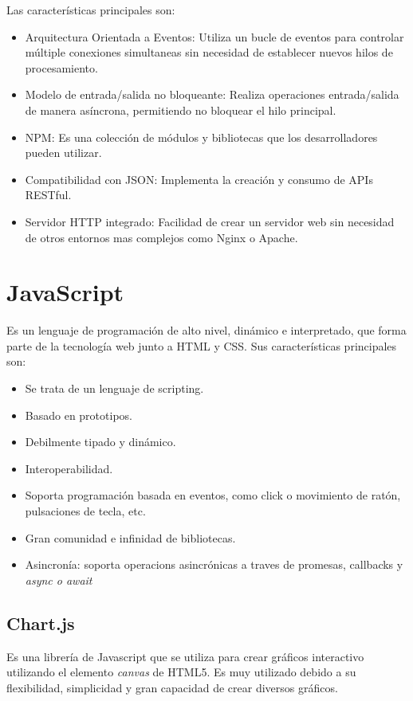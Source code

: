 \documentclass[a4paper, 12pt]{book}
\begin{document}
Las características principales son:

\begin{itemize}
    \item Arquitectura Orientada a Eventos: Utiliza un bucle de eventos para controlar múltiple conexiones simultaneas sin necesidad de establecer nuevos hilos de procesamiento.
    \item Modelo de entrada/salida no bloqueante: Realiza operaciones entrada/salida de manera asíncrona, permitiendo no bloquear el hilo principal.
    \item NPM: Es una colección de módulos y bibliotecas que los desarrolladores pueden utilizar.
    \item Compatibilidad con JSON: Implementa la creación y consumo de APIs RESTful.
    \item Servidor HTTP integrado: Facilidad de crear un servidor web sin necesidad de otros entornos mas complejos como Nginx o Apache.
\end{itemize}

\section{JavaScript}

Es un lenguaje de programación de alto nivel, dinámico e interpretado, que forma parte de la tecnología web junto a HTML y CSS. Sus características principales son:
\begin{itemize}
    \item Se trata de un lenguaje de scripting.
    \item Basado en prototipos.
    \item Debilmente tipado y dinámico. 
    \item Interoperabilidad.
    \item Soporta programación basada en eventos, como click o movimiento de ratón, pulsaciones de tecla, etc.
    \item Gran comunidad e infinidad de bibliotecas.
    \item Asincronía: soporta operacions asincrónicas a traves de promesas, callbacks y \textit{async o await}
\end{itemize}

\subsection{Chart.js}
Es una librería de Javascript que se utiliza para crear gráficos interactivo utilizando el elemento \textit{\<canvas\>} de HTML5. Es muy utilizado debido a su flexibilidad, simplicidad y gran capacidad de crear diversos gráficos.
\end{document}
